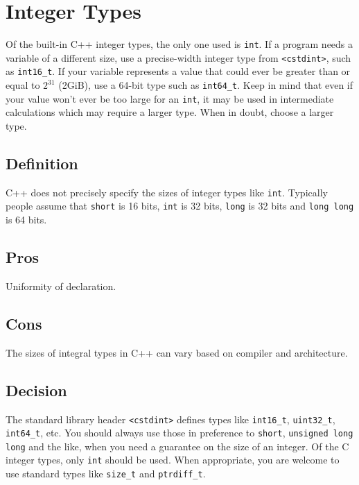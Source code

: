 
\section{Integer Types}\label{sec:integer-types}
Of the built-in C++ integer types, the only one used is \texttt{int}. If a program needs a variable of a different size, use a precise-width integer type from \texttt{<cstdint>}, such as \texttt{int16_t}. If your variable represents a value that could ever be greater than or equal to $2^{31}$ (2GiB), use a 64-bit type such as \texttt{int64_t}. Keep in mind that even if your value won't ever be too large for an \texttt{int}, it may be used in intermediate calculations which may require a larger type. When in doubt, choose a larger type.

\subsection{Definition}
C++ does not precisely specify the sizes of integer types like \texttt{int}. Typically people assume that \texttt{short} is 16 bits, \texttt{int} is 32 bits, \texttt{long} is 32 bits and \texttt{long long} is 64 bits.

\subsection{Pros}
Uniformity of declaration.

\subsection{Cons}
The sizes of integral types in C++ can vary based on compiler and architecture.

\subsection{Decision}
The standard library header \texttt{<cstdint>} defines types like \texttt{int16_t}, \texttt{uint32_t}, \texttt{int64_t}, etc. You should always use those in preference to \texttt{short}, \texttt{unsigned long long} and the like, when you need a guarantee on the size of an integer. Of the C integer types, only \texttt{int} should be used. When appropriate, you are welcome to use standard types like \texttt{size_t} and \texttt{ptrdiff_t}.

